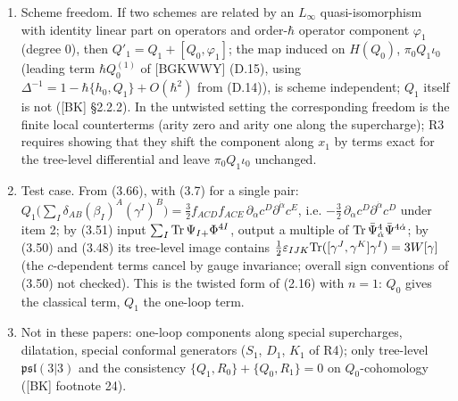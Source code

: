 \documentclass[10pt]{article}
\begin{document}
\begin{enumerate}
\item Scheme freedom. If two schemes are related by an $L_\infty$ quasi-isomorphism with identity linear part on operators and order-$\hbar$ operator component $\varphi_1$ (degree $0$), then $Q'_1=Q_1+[Q_0,\varphi_1]$; the map induced on $H(Q_0)$, $\pi_0Q_1\iota_0$ (leading term $\hbar Q^{(1)}_0$ of [BGKWWY] (D.15), using $\Delta^{-1}=1-\hbar\{h_0,Q_1\}+O(\hbar^2)$ from (D.14)), is scheme independent; $Q_1$ itself is not ([BK] \S2.2.2). In the untwisted setting the corresponding freedom is the finite local counterterms (arity zero and arity one along the supercharge); R3 requires showing that they shift the component along $x_1$ by terms exact for the tree-level differential and leave $\pi_0Q_1\iota_0$ unchanged.
\item Test case. From (3.66), with (3.7) for a single pair: $Q_1\big(\sum_I\delta_{AB}(\beta_I)^A(\gamma^I)^B\big)=\tfrac32f_{ACD}f_{ACE}\,\partial_{\dot\alpha}c^D\partial^{\dot\alpha}c^E$, i.e. $-\tfrac32\,\partial_{\dot\alpha}c^D\partial^{\dot\alpha}c^D$ under item 2; by (3.51) input $\sum_I{\rm Tr}\,\Psi_{I+}\Phi^{4I}$, output a multiple of ${\rm Tr}\,\bar\Psi^4_{\dot\alpha}\bar\Psi^{4\dot\alpha}$; by (3.50) and (3.48) its tree-level image contains $\tfrac12\varepsilon_{IJK}{\rm Tr}([\gamma^J,\gamma^K]\gamma^I)=3W[\gamma]$ (the $c$-dependent terms cancel by gauge invariance; overall sign conventions of (3.50) not checked). This is the twisted form of (2.16) with $n=1$: $Q_0$ gives the classical term, $Q_1$ the one-loop term.
\item Not in these papers: one-loop components along special supercharges, dilatation, special conformal generators ($S_1$, $D_1$, $K_1$ of R4); only tree-level $\mathfrak{psl}(3|3)$ and the consistency $\{Q_1,R_0\}+\{Q_0,R_1\}=0$ on $Q_0$-cohomology ([BK] footnote 24).
\end{enumerate}
\end{document}
